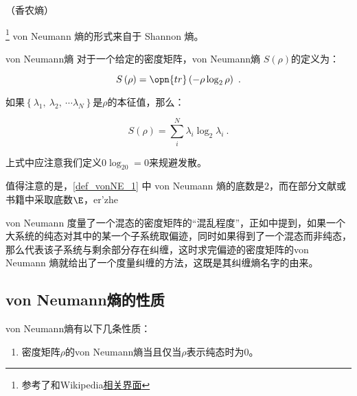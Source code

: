 
\begin{issues}
\issueTODO
\issueMissDepend（香农熵）
\end{issues}


\footnote{参考了\cite{量子信息}和Wikipedia\href{https://en.wikipedia.org/wiki/Von_Neumann_entropy}{相关界面}}
von Neumann 熵的形式来自于 Shannon 熵。

\begin{definition}{von Neumann熵}\label{def_vonNE_1}
对于一个给定的密度矩阵，von Neumann熵 $S\left(\rho\right)$的定义为：

\begin{equation}
S\left( \rho \right) = \opn{tr}\left( - \rho \log_2 \rho \right)~.
\end{equation}

如果$\left\{ \lambda_1,~\lambda_2,~\cdots \lambda_N \right\}$是$\rho$的本征值，那么：

\begin{equation}
S\left(\rho\right) = \sum_i^N \lambda_i \log_2 \lambda_i~.
\end{equation}

上式中应注意我们定义$0\log_20 = 0$来规避发散。

\end{definition}

值得注意的是，\autoref{def_vonNE_1} 中 von Neumann 熵的底数是$2$，而在部分文献或书籍中采取底数$\E$，er'zhe

von Neumann 度量了一个混态的密度矩阵的“混乱程度”，正如中提到，如果一个大系统的纯态对其中的某一个子系统取偏迹，同时如果得到了一个混态而非纯态，那么代表该子系统与剩余部分存在纠缠，这时求完偏迹的密度矩阵的von Neumann 熵就给出了一个度量纠缠的方法，这既是其纠缠熵名字的由来。

\subsection{von Neumann熵的性质}

von Neumann熵有以下几条性质：

\begin{enumerate}
\item 密度矩阵$\rho$的von Neumann熵当且仅当$\rho$表示纯态时为0。
\end{enumerate}


